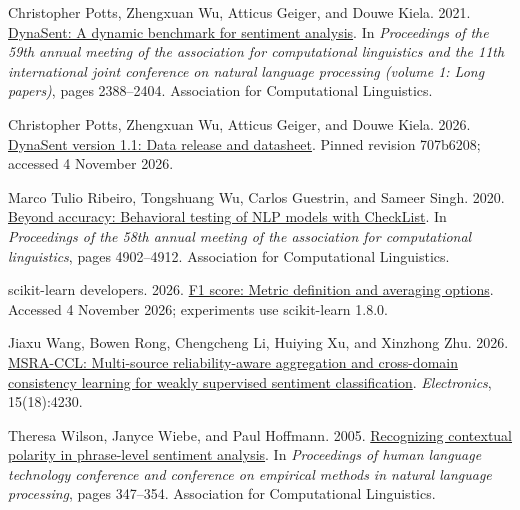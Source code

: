 \documentclass[11pt]{article}
\begin{document}
\begin{thebibliography}{}
 \hypertarget{ref_potts2021dynasent}{}Christopher Potts, Zhengxuan Wu, Atticus Geiger, and Douwe Kiela. 2021. \href{https://doi.org/10.18653/v1/2021.acl-long.186}{DynaSent: A dynamic benchmark for sentiment analysis}. In \emph{Proceedings of the 59th annual meeting of the association for computational linguistics and the 11th international joint conference on natural }\emph{language processing (volume 1: Long papers)}, pages 2388--2404. Association for Computational Linguistics.

 \hypertarget{ref_dynasentData}{}Christopher Potts, Zhengxuan Wu, Atticus Geiger, and Douwe Kiela. 2026. \href{https://github.com/cgpotts/dynasent/tree/707b6208978bfe7ff251a0c3263c9f0552c27b48}{DynaSent version 1.1: Data release and datasheet}. Pinned revision 707b6208; accessed 4 November 2026.

 \hypertarget{ref_ribeiro2020checklist}{}Marco Tulio Ribeiro, Tongshuang Wu, Carlos Guestrin, and Sameer Singh. 2020. \href{https://doi.org/10.18653/v1/2020.acl-main.442}{Beyond accuracy: Behavioral testing of NLP models with CheckList}. In \emph{Proceedings of the 58th annual meeting of the association for computational linguistics}, pages 4902--4912. Association for Computational Linguistics.

 \hypertarget{ref_sklearnMetrics}{}scikit-learn developers. 2026. \href{https://sklearn.org/stable/modules/generated/sklearn.metrics.f1_score.html}{F1 score: Metric definition and averaging options}. Accessed 4 November 2026; experiments use scikit-learn 1.8.0.

 \hypertarget{ref_wang2026msra}{}Jiaxu Wang, Bowen Rong, Chengcheng Li, Huiying Xu, and Xinzhong Zhu. 2026. \href{https://doi.org/10.3390/electronics15184230}{MSRA-CCL: Multi-source reliability-aware aggregation and cross-domain consistency learning for weakly supervised sentiment classification}. \emph{Electronics}, 15(18):4230.

 \hypertarget{ref_wilson2005contextual}{}Theresa Wilson, Janyce Wiebe, and Paul Hoffmann. 2005. \href{https://aclanthology.org/H05-1044/}{Recognizing contextual polarity in phrase-level sentiment analysis}. In \emph{Proceedings of human language technology conference and conference on empirical methods in natural language processing}, pages 347--354. Association for Computational Linguistics.

\end{thebibliography}
\end{document}
